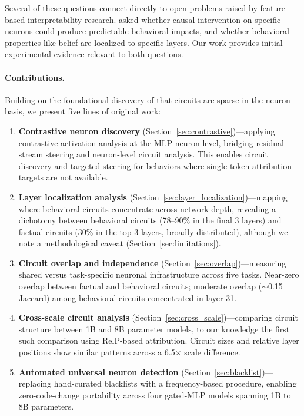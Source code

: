 \documentclass[11pt]{article}
\begin{document}
Several of these questions connect directly to open problems raised by feature-based interpretability research.
\citet{chalnick2025goodfire} asked whether causal intervention on specific neurons could produce predictable behavioral impacts, and whether behavioral properties like belief are localized to specific layers.
Our work provides initial experimental evidence relevant to both questions.

\paragraph{Contributions.}
Building on the foundational discovery of \citet{arora2025circuits} that circuits are sparse in the neuron basis, we present five lines of original work:

\begin{enumerate}[leftmargin=2em]
    \item \textbf{Contrastive neuron discovery} (Section~\ref{sec:contrastive})---applying contrastive activation analysis at the MLP neuron level, bridging residual-stream steering and neuron-level circuit analysis. This enables circuit discovery and targeted steering for behaviors where single-token attribution targets are not available.

    \item \textbf{Layer localization analysis} (Section~\ref{sec:layer_localization})---mapping where behavioral circuits concentrate across network depth, revealing a dichotomy between behavioral circuits (78--90\% in the final 3 layers) and factual circuits (30\% in the top 3 layers, broadly distributed), although we note a methodological caveat (Section~\ref{sec:limitations}).

    \item \textbf{Circuit overlap and independence} (Section~\ref{sec:overlap})---measuring shared versus task-specific neuronal infrastructure across five tasks. Near-zero overlap between factual and behavioral circuits; moderate overlap (${\sim}$0.15 Jaccard) among behavioral circuits concentrated in layer 31.

    \item \textbf{Cross-scale circuit analysis} (Section~\ref{sec:cross_scale})---comparing circuit structure between 1B and 8B parameter models, to our knowledge the first such comparison using RelP-based attribution. Circuit sizes and relative layer positions show similar patterns across a 6.5$\times$ scale difference.

    \item \textbf{Automated universal neuron detection} (Section~\ref{sec:blacklist})---replacing hand-curated blacklists with a frequency-based procedure, enabling zero-code-change portability across four gated-MLP models spanning 1B to 8B parameters.
\end{enumerate}
\end{document}
